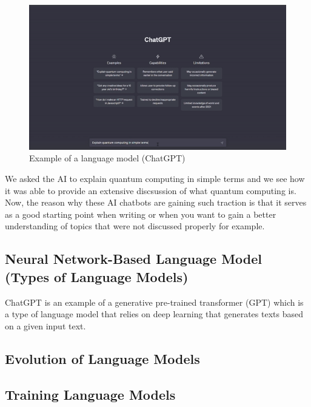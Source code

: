 \documentclass[
  letterpaper,
  DIV=11,
  numbers=noendperiod]{scrartcl}
\begin{document}
\begin{figure}

{\centering \includegraphics{Figures_LLM/chat_gpt_sample.gif}

}

\caption{\label{fig-gpt}Example of a language model (ChatGPT)}

\end{figure}

We asked the AI to explain quantum computing in simple terms and we see
how it was able to provide an extensive discsussion of what quantum
computing is. Now, the reason why these AI chatbots are gaining such
traction is that it serves as a good starting point when writing or when
you want to gain a better understanding of topics that were not
discussed properly for example.

\hypertarget{neural-network-based-language-model-types-of-language-models}{%
\subsection{Neural Network-Based Language Model (Types of Language
Models)}\label{neural-network-based-language-model-types-of-language-models}}

ChatGPT is an example of a generative pre-trained transformer (GPT)
which is a type of language model that relies on deep learning that
generates texts based on a given input text.

\hypertarget{evolution-of-language-models}{%
\subsection{Evolution of Language
Models}\label{evolution-of-language-models}}

\hypertarget{training-language-models}{%
\subsection{Training Language Models}\label{training-language-models}}
\end{document}
